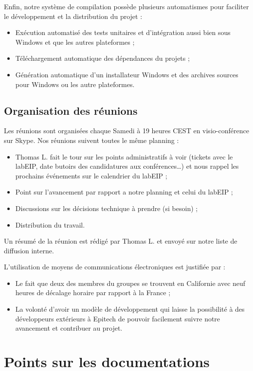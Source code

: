 \documentclass[francais]{rtxreport}
\begin{document}
Enfin, notre système de compilation possède plusieurs automatismes pour
faciliter le développement et la distribution du projet :
\begin{itemize}
\item Exécution automatisé des tests unitaires et d'intégration aussi bien sous
Windows et que les autres plateformes ;
\item Téléchargement automatique des dépendances du projets ;
\item Génération automatique d'un installateur Windows et des archives sources
pour Windows ou les autre plateformes.
\end{itemize}

\section{Organisation des réunions}

Les réunions sont organisées chaque Samedi à 19 heures CEST en visio-conférence
sur Skype. Nos réunions suivent toutes le même planning :
\begin{itemize}
\item Thomas L. fait le tour sur les points administratifs à voir (tickets avec
le labEIP, date butoirs des candidatures aux conférences\ldots) et nous
rappel les prochains événements sur le calendrier du labEIP ;
\item Point sur l'avancement par rapport a notre planning et celui du labEIP ;
\item Discussions sur les décisions technique à prendre (si besoin) ;
\item Distribution du travail.
\end{itemize}

Un résumé de la réunion est rédigé par Thomas L. et envoyé sur notre liste de
diffusion interne.

L'utilisation de moyens de communications électroniques est justifiée par :
\begin{itemize}
\item Le fait que deux des membres du groupes se trouvent en Californie avec
neuf heures de décalage horaire par rapport à la France ;
\item La volonté d'avoir un modèle de développement qui laisse la possibilité à
des développeurs extérieurs à Epitech de pouvoir facilement suivre notre
avancement et contribuer au projet.
\end{itemize}

\chapter{Points sur les documentations}
\end{document}
